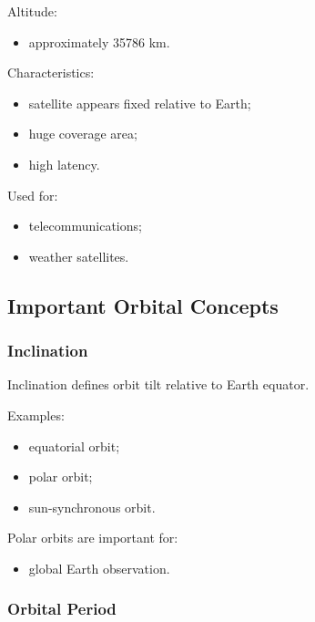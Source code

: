 \documentclass[10pt,a4paper,twocolumn]{article}
\begin{document}
Altitude:
\begin{itemize}
    \item approximately 35786 km.
\end{itemize}

Characteristics:
\begin{itemize}
    \item satellite appears fixed relative to Earth;
    \item huge coverage area;
    \item high latency.
\end{itemize}

Used for:
\begin{itemize}
    \item telecommunications;
    \item weather satellites.
\end{itemize}


\subsection{Important Orbital Concepts}


\subsubsection*{Inclination}

Inclination defines orbit tilt relative to Earth equator.

Examples:
\begin{itemize}
    \item equatorial orbit;
    \item polar orbit;
    \item sun-synchronous orbit.
\end{itemize}

Polar orbits are important for:
\begin{itemize}
    \item global Earth observation.
\end{itemize}


\subsubsection*{Orbital Period}
\end{document}
